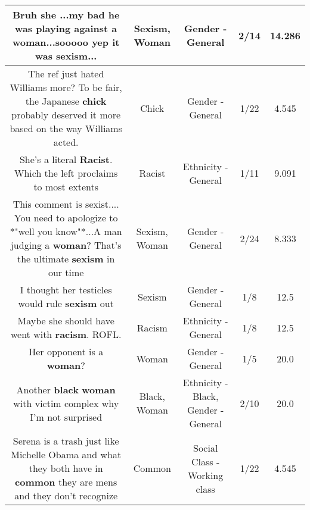 \documentclass[11pt]{article}
\newlength\mylength
\begin{document}
\begin{center}
\begin{longtable}{|C{.65\mylength}|C{.30\mylength}|C{.12\mylength}|C{.12\mylength}|C{.12\mylength}|}
  \small Bruh she ...my bad he was playing against a \textbf{woman}...sooooo yep it was \textbf{sexism}...\normalsize   & Sexism, Woman & Gender - General & 2/14 & 14.286 \\  \hline
  \small The ref just hated Williams more? To be fair, the Japanese \textbf{chick} probably deserved it more based on the way Williams acted.\normalsize   & Chick & Gender - General & 1/22 & 4.545 \\  \hline
  \small She's a literal \textbf{Racist}. Which the left proclaims to most extents\normalsize   & Racist & Ethnicity - General & 1/11 & 9.091 \\  \hline
  \small This comment is sexist.... You need to apologize to *"well you know"*...A man judging a \textbf{woman}? That's the ultimate \textbf{sexism} in our time\normalsize   & Sexism, Woman & Gender - General & 2/24 & 8.333 \\  \hline
  \small I thought her testicles would rule \textbf{sexism} out\normalsize   & Sexism & Gender - General & 1/8 & 12.5 \\  \hline
  \small Maybe she should have went with \textbf{racism}. ROFL.\normalsize   & Racism & Ethnicity - General & 1/8 & 12.5 \\  \hline
  \small Her opponent is a \textbf{woman}?\normalsize   & Woman & Gender - General & 1/5 & 20.0 \\  \hline
  \small Another \textbf{black} \textbf{woman} with victim complex why I'm not surprised\normalsize   & Black, Woman & Ethnicity - Black, Gender - General & 2/10 & 20.0 \\  \hline
  \small Serena is a trash just like Michelle Obama and what they both have in \textbf{common} they are mens and they don't recognize\normalsize   & Common & Social Class - Working class & 1/22 & 4.545 \\  \hline

\end{longtable}
\end{center}
\end{document}

